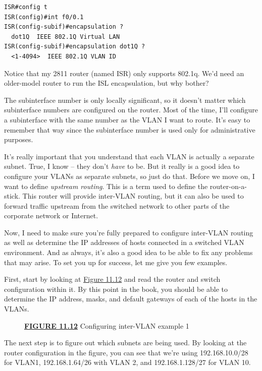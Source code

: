 \begin{verbatim}
ISR#config t
ISR(config)#int f0/0.1
ISR(config-subif)#encapsulation ?
  dot1Q  IEEE 802.1Q Virtual LAN
ISR(config-subif)#encapsulation dot1Q ?
  <1-4094>  IEEE 802.1Q VLAN ID
\end{verbatim}

Notice that my 2811 router (named ISR) only supports 802.1q. We'd need
an older-model router to run the ISL encapsulation, but why bother?

The subinterface number is only locally significant, so it doesn't
matter which subinterface numbers are configured on the router. Most of
the time, I'll configure a subinterface with the same number as the VLAN
I want to route. It's easy to remember that way since the subinterface
number is used only for administrative purposes.

It's really important that you understand that each VLAN is actually a
separate subnet. True, I know -- they don't \emph{have} to be. But it
really is a good idea to configure your VLANs as separate subnets, so
just do that. Before we move on, I want to define \emph{upstream
routing}. This is a term used to define the router-on-a-stick. This
router will provide inter-VLAN routing, but it can also be used to
forward traffic upstream from the switched network to other parts of the
corporate network or Internet.

Now, I need to make sure you're fully prepared to configure inter-VLAN
routing as well as determine the IP addresses of hosts connected in a
switched VLAN environment. And as always, it's also a good idea to be
able to fix any problems that may arise. To set you up for success, let
me give you few examples.

First, start by looking at
\protect\hyperlink{c11.xhtmlux5cux23figure11-12}{Figure 11.12} and read
the router and switch configuration within it. By this point in the
book, you should be able to determine the IP address, masks, and default
gateways of each of the hosts in the VLANs.



\begin{figure}
\centering
\caption{{\protect\hyperlink{c11.xhtmlux5cux23figureanchor11-12}{\textbf{FIGURE
11.12}} Configuring inter-VLAN example 1}}
\end{figure}

The next step is to figure out which subnets are being used. By looking
at the router configuration in the figure, you can see that we're using
192.168.10.0/28 for VLAN1, 192.168.1.64/26 with VLAN 2, and
192.168.1.128/27 for VLAN 10.

